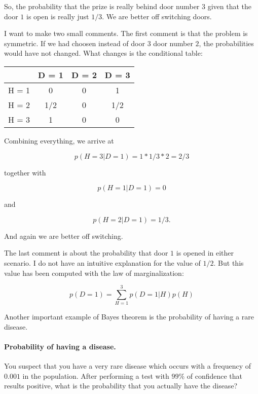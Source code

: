 \documentclass[12pt]{article}
\begin{document}
\noindent
So, the probability that the prize is really behind door number $3$ given that the 
door $1$ is open is really just $1/3$.
We are better off switching doors.

I want to make two small comments.
The first comment is that the problem is symmetric. 
If we had choosen instead of door $3$ door number $2$,
the probabilities would have not changed.
What changes is the conditional table:

\begin{center}
\begin{tabular}{| c | c | c | c |}
\hline
& D = 1 & D = 2 & D = 3 \\
\hline
H = 1 & 0 & 0 & 1 \\
\hline 
H = 2 & 1/2 & 0 & 1/2 \\
\hline
H = 3 & 1 & 0 & 0 \\
\hline
\end{tabular}
\end{center}

\noindent
Combining everything, we arrive at

\begin{equation}
p( H = 3 | D = 1 ) = 1 * 1/3 * 2 = 2/3
\end{equation}

\noindent
together with

\begin{equation}
p ( H = 1 | D = 1 ) = 0
\end{equation}

\noindent
and 

\begin{equation}
p ( H = 2 | D = 1 ) = 1/3.
\end{equation}

\noindent
And again we are better off switching.

The last comment is about the probability that door $1$ is opened in either scenario. 
I do not have an intuitive explanation for the value of $1/2$.
But this value has been computed with the law of marginalization:

\begin{equation}
p(D = 1) = \sum_{H = 1}^{3}  p(D = 1 | H ) p(H)
\end{equation}

\vspace{.5cm}
Another important example of Bayes theorem is the 
probability of having a rare disease.

\paragraph{Probability of having a disease.}
You suspect that you have a very rare disease which occurs with a frequency of $0.001$ in the population.
After performing a test with $99\%$ of confidence that results positive, what is the probability that 
you actually have the disease?
\end{document}
